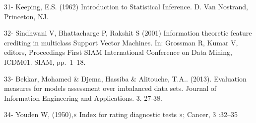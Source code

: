 \documentclass[11pt]{article}
\begin{document}
31- Keeping, E.S. (1962) Introduction to Statistical Inference. D. Van
Nostrand, Princeton, NJ.

32- Sindhwani V, Bhattacharge P, Rakshit S (2001) Information theoretic
feature crediting in multiclass Support Vector Machines. In: Grossman R,
Kumar V, editors, Proceedings First SIAM International Conference on
Data Mining, ICDM01. SIAM, pp.~1--18.

33- Bekkar, Mohamed \& Djema, Hassiba \& Alitouche, T.A.. (2013).
Evaluation measures for models assessment over imbalanced data sets.
Journal of Information Engineering and Applications. 3. 27-38.

34- Youden W, (1950),« Index for rating diagnostic tests »; Cancer, 3
:32--35


    
    
    
    
\end{document}
